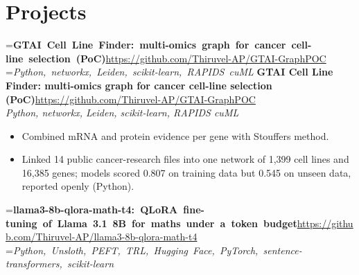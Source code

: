 \documentclass[a4paper,11pt]{article}
\newcommand{\project}[3]{%
  \textbf{#1}\hfill#3\\ {\color{muted}\small\textit{#2}}\par}
\newcommand{\gap}{\vspace{5pt}}
\begin{document}
\section{Projects}
=\hbox{\textbf{GTAI Cell Line Finder: multi-omics graph for cancer cell-line selection (PoC)}\hspace{1em}\url{https://github.com/Thiruvel-AP/GTAI-GraphPOC}}%
=\hbox{{\small\textit{Python, networkx, Leiden, scikit-learn, RAPIDS cuML}}}%
\ifdim\wd0>\linewidth
\ifdim\wd2>\linewidth
\textbf{GTAI Cell Line Finder: multi-omics graph for cancer cell-line selection (PoC)}\\ {\color{muted}\small\textit{Python, networkx, Leiden, scikit-learn, RAPIDS cuML}}\\ \hspace*{\fill}{\small\url{https://github.com/Thiruvel-AP/GTAI-GraphPOC}}\par
\else
\textbf{GTAI Cell Line Finder: multi-omics graph for cancer cell-line selection (PoC)}\\ {\color{muted}\small\textit{Python, networkx, Leiden, scikit-learn, RAPIDS cuML}}\hfill{\small\url{https://github.com/Thiruvel-AP/GTAI-GraphPOC}}\par
\fi
\else
\project{GTAI Cell Line Finder: multi-omics graph for cancer cell-line selection (PoC)}{Python, networkx, Leiden, scikit-learn, RAPIDS cuML}{\url{https://github.com/Thiruvel-AP/GTAI-GraphPOC}}
\fi
\begin{itemize}
  \item Combined mRNA and protein evidence per gene with Stouffer\textquotesingle{}s method.
  \item Linked 14 public cancer-research files into one network of 1,399 cell lines and 16,385 genes; models scored 0.807 on training data but 0.545 on unseen data, reported openly (Python).
\end{itemize}
\gap
{}
=\hbox{\textbf{llama3-8b-qlora-math-t4: QLoRA fine-tuning of Llama 3.1 8B for maths under a token budget}\hspace{1em}\url{https://github.com/Thiruvel-AP/llama3-8b-qlora-math-t4}}%
=\hbox{{\small\textit{Python, Unsloth, PEFT, TRL, Hugging Face, PyTorch, sentence-transformers, scikit-learn}}}%
\end{document}
